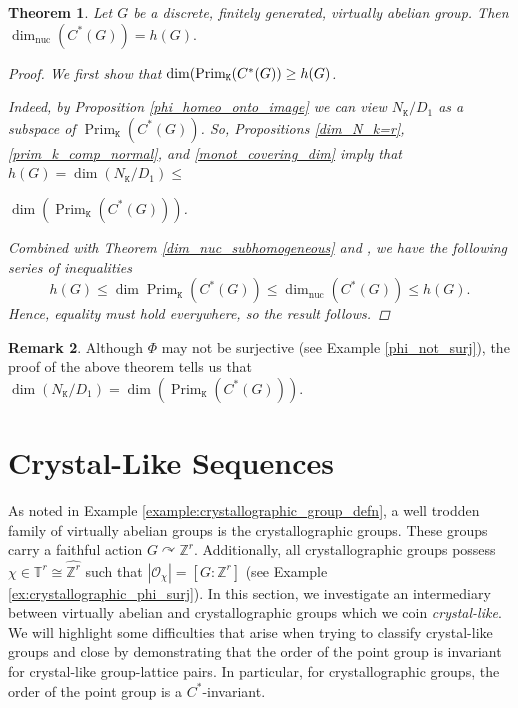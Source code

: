 \documentclass[11pt, twoside]{amsart}
\newcommand{\te}[1]{\operatorname{#1}}
\newcommand{\zn}{\mathbb{Z}}
\newcommand{\mc}{\mathcal}
\newcommand{\mt}{\mathtt}
\newcommand{\dimnuc }{\dim_{\operatorname{nuc}}}
\newtheorem{thm}{Theorem}[section]
\theoremstyle{definition}
\newtheorem{rmk}[thm]{Remark}
\newcommand{\B}{\mathbb}
\newcommand{\Z}{\B{Z}}
\newcommand{\T}{\B{T}}
\begin{document}
 
 \begin{thm}\label{main_result_2}
Let $G$ be a discrete, finitely generated, virtually abelian group. Then $\dimnuc (C^*(G))=h(G).$
\begin{proof}
We first show that $\dim(\textnormal{Prim}_{\mt{K}}(C^*(G))\geq h(G)$. \par
Indeed, by Proposition \ref{phi_homeo_onto_image} we can view $N_{\mt{K}}/D_1$ as a subspace of $\te{Prim}_{\mt{K}}(C^*(G))$. So, Propositions \ref{dim_N_k=r}, \ref{prim_k_comp_normal}, and \ref{monot_covering_dim} imply that $h(G)=\dim(N_{\mt{K}}/D_1)\leq $ \par\noindent$\dim(\te{Prim}_{\mt{K}}(C^*(G)))$. \par
Combined with Theorem \ref{dim_nuc_subhomogeneous} and \cite[Prop. 2.14]{BL24}, we have the following series of inequalities
$$h(G)\leq \dim \te{Prim}_{\mt{K}}(C^*(G))\leq \dimnuc (C^*(G))\leq h(G).$$
Hence, equality must hold everywhere, so the result follows.
\end{proof}
 \end{thm}
 \begin{rmk}
     Although $\Phi$ may not be surjective (see Example \ref{phi_not_surj}), the proof of the above theorem tells us that $\dim(N_{\mt{K}}/D_1)=\dim(\te{Prim}_{\mt{K}}(C^*(G)))$.
 \end{rmk}

     
 \section{Crystal-Like Sequences}\label{sec:crystal_like_groups}

As noted in Example \ref{example:crystallographic_group_defn}, a well trodden family of virtually abelian groups is the crystallographic groups. These groups carry a faithful action $G\curvearrowright \Z^r$. Additionally, all crystallographic groups possess $\chi\in \T^r\cong \widehat{\Z^r}$ such that $|\mc{O}_\chi|=[G:\zn^r]$ (see Example \ref{ex:crystallographic_phi_surj}). In this section, we investigate an intermediary between virtually abelian and crystallographic groups which we coin \textit{crystal-like}. We will highlight some difficulties that arise when trying to classify crystal-like groups and close by demonstrating that the order of the point group is invariant for crystal-like group-lattice pairs. In particular, for crystallographic groups, the order of the point group is a $C^*$-invariant.
\par
\end{document}
